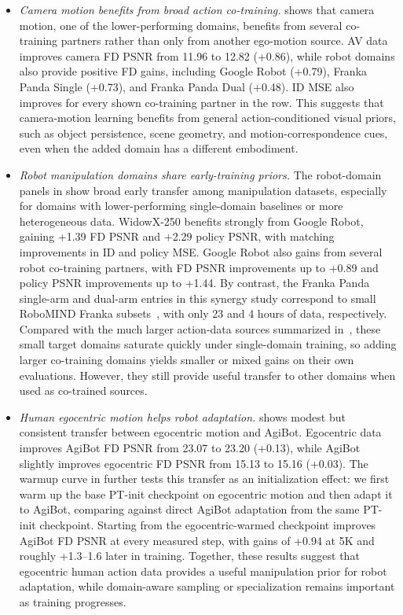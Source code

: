 \begin{itemize}[leftmargin=*]
    \item \textit{Camera motion benefits from broad action co-training.}
     shows that camera motion, one of the lower-performing domains, benefits from several co-training partners rather than only from another ego-motion source.
    AV data improves camera FD PSNR from 11.96 to 12.82 (+0.86), while robot domains also provide positive FD gains, including Google Robot (+0.79), Franka Panda Single (+0.73), and Franka Panda Dual (+0.48).
    ID MSE also improves for every shown co-training partner in the row.
    This suggests that camera-motion learning benefits from general action-conditioned visual priors, such as object persistence, scene geometry, and motion-correspondence cues, even when the added domain has a different embodiment.

    \item \textit{Robot manipulation domains share early-training priors.}
    The robot-domain panels in  show broad early transfer among manipulation datasets, especially for domains with lower-performing single-domain baselines or more heterogeneous data.
    WidowX-250 benefits strongly from Google Robot, gaining +1.39 FD PSNR and +2.29 policy PSNR, with matching improvements in ID and policy MSE.
    Google Robot also gains from several robot co-training partners, with FD PSNR improvements up to +0.89 and policy PSNR improvements up to +1.44.
    By contrast, the Franka Panda single-arm and dual-arm entries in this synergy study correspond to small RoboMIND Franka subsets~\citep{wu2024robomind}, with only 23 and 4 hours of data, respectively. Compared with the much larger action-data sources summarized in~, these small target domains saturate quickly under single-domain training, so adding larger co-training domains yields smaller or mixed gains on their own evaluations. However, they still provide useful transfer to other domains when used as co-trained sources.

    \item \textit{Human egocentric motion helps robot adaptation.}
     shows modest but consistent transfer between egocentric motion and AgiBot.
    Egocentric data improves AgiBot FD PSNR from 23.07 to 23.20 (+0.13), while AgiBot slightly improves egocentric FD PSNR from 15.13 to 15.16 (+0.03).
    The warmup curve in  further tests this transfer as an initialization effect: we first warm up the base PT-init checkpoint on egocentric motion and then adapt it to AgiBot, comparing against direct AgiBot adaptation from the same PT-init checkpoint.
    Starting from the egocentric-warmed checkpoint improves AgiBot FD PSNR at every measured step, with gains of +0.94 at 5K and roughly +1.3--1.6 later in training.
    Together, these results suggest that egocentric human action data provides a useful manipulation prior for robot adaptation, while domain-aware sampling or specialization remains important as training progresses.
\end{itemize}


